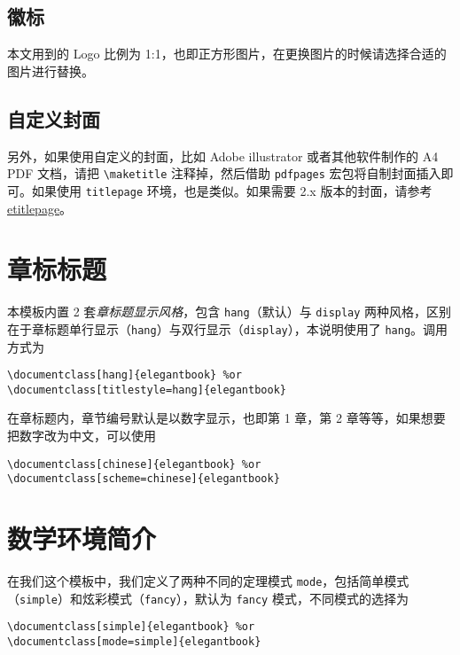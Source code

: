 \documentclass[cn,10pt,math=newtx,citestyle=gb7714-2015,bibstyle=gb7714-2015]{elegantbook}
\begin{document}
\subsection{徽标}

本文用到的 Logo 比例为 1:1，也即正方形图片，在更换图片的时候请选择合适的图片进行替换。

\subsection{自定义封面}

另外，如果使用自定义的封面，比如 Adobe illustrator 或者其他软件制作的 A4 PDF 文档，请把 \lstinline{\maketitle} 注释掉，然后借助 \lstinline{pdfpages} 宏包将自制封面插入即可。如果使用 \lstinline{titlepage} 环境，也是类似。如果需要 2.x 版本的封面，请参考 \href{https://github.com/EthanDeng/etitlepage}{etitlepage}。

\section{章标标题}

本模板内置 2 套\textit{章标题显示风格}，包含 \lstinline{hang}（默认）与 \lstinline{display} 两种风格，区别在于章标题单行显示（\lstinline{hang}）与双行显示（\lstinline{display}），本说明使用了 \lstinline{hang}。调用方式为
\begin{lstlisting}
\documentclass[hang]{elegantbook} %or
\documentclass[titlestyle=hang]{elegantbook}
\end{lstlisting}

在章标题内，章节编号默认是以数字显示，也即{\kaishu 第 1 章}，{\kaishu 第 2 章}等等，如果想要把数字改为中文，可以使用
\begin{lstlisting}
\documentclass[chinese]{elegantbook} %or
\documentclass[scheme=chinese]{elegantbook}
\end{lstlisting}

\section{数学环境简介}

在我们这个模板中，我们定义了两种不同的定理模式 \lstinline{mode}，包括简单模式（\lstinline{simple}）和炫彩模式（\lstinline{fancy}），默认为 \lstinline{fancy} 模式，不同模式的选择为
\begin{lstlisting}
\documentclass[simple]{elegantbook} %or
\documentclass[mode=simple]{elegantbook}
\end{lstlisting}
\end{document}
